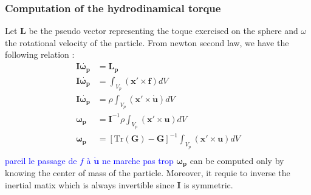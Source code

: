 \documentclass[10pt,a4paper,openany]{article}
\theoremstyle{mytheoremstyle}
\theoremstyle{mytheoremstyle}
\theoremstyle{myproblemstyle}
\begin{document}
\subsubsection*{Computation of the hydrodinamical torque} 
Let $\bm{L}$ be the pseudo vector representing the toque exercised on the sphere and $\omega$ the rotational velocity of the particle.
From newton second law, we have the following relation :
\begin{align}
    \label{eq:torque}
    \bm{I} \bm{\dot{\omega_p}} &= \bm{L_p} \\
    \bm{I} \bm{\dot{\omega_p}} &= \int_{V_p} \left(\bm{x'}\times\bm{f}\right) dV\\
    \bm{I} \bm{\dot{\omega_p}} &= \rho\int_{V_p} \left(\bm{x'}\times\bm{\dot{u}}\right) dV\\
    \bm{\omega_p} &= \bm{I}^{-1} \rho\int_{V_p} \left(\bm{x'}\times\bm{u}\right) dV\\
    \bm{\omega_p} &= \left[\text{Tr}(\bm{G})-\bm{G}\right]^{-1} \int_{V_p} \left(\bm{x'}\times\bm{u}\right) dV\\
\end{align} 
\textcolor{blue}{pareil le passage de $f$ à $\bm{\dot{u}}$ ne marche pas trop}
$\bm{\omega_p}$ can be computed only by knowing the center of mass of the particle.
Moreover, it requie to inverse the inertial matix which is always invertible since $\bm{I}$ is symmetric.   
\end{document}
